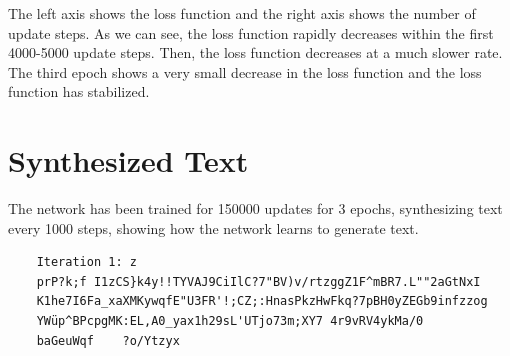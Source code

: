 \documentclass[11pt]{article}
\begin{document}
The left axis shows the loss function and the right axis shows the number of update steps. As we can see, the loss function rapidly decreases within the first 4000-5000 update steps.
Then, the loss function decreases at a much slower rate. The third epoch shows a very small decrease in the loss function and the loss function has stabilized. 


\section*{Synthesized Text}

The network has been trained for 150000 updates for 3 epochs, synthesizing text every 1000 steps, showing how the network learns to generate text.

\begin{verbatim}
    Iteration 1: z
    prP?k;f I1zCS}k4y!!TYVAJ9CiIlC?7"BV)v/rtzggZ1F^mBR7.L""2aGtNxI
    K1he7I6Fa_xaXMKywqfE"U3FR'!;CZ;:HnasPkzHwFkq?7pBH0yZEGb9infzzog
    YWüp^BPcpgMK:EL,A0_yax1h29sL'UTjo73m;XY7 4r9vRV4ykMa/0	
    baGeuWqf	?o/Ytzyx
\end{verbatim}
\end{document}
